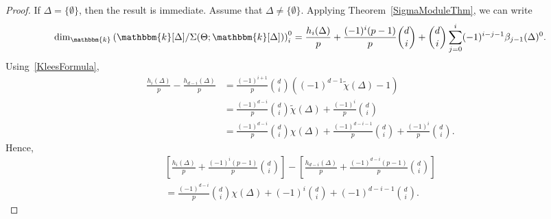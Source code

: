 \documentclass[10pt]{amsart}
\theoremstyle{definition}
\newcommand{\field}{\mathbbm{k}}
\begin{document}
\begin{proof}
If $\Delta=\{\emptyset\}$, then the result is immediate. Assume that $\Delta\not=\{\emptyset\}$. Applying Theorem~\ref{SigmaModuleThm}, we can write
\[
\dim_\field \left(\field[\Delta]/\Sigma(\Theta;\field[\Delta])\right)_i^0=\frac{h_i(\Delta)}{p}+\frac{(-1)^i(p-1)}{p}\binom{d}{i}+\binom{d}{i}\sum_{j=0}^i(-1)^{i-j-1}\beta_{j-1}(\Delta)^0.
\]
Using~\eqref{KleesFormula},
\begin{align*}
\frac{h_i(\Delta)}{p}-\frac{h_{d-i}(\Delta)}{p}&=\frac{(-1)^{i+1}}{p}\binom{d}{i}((-1)^{d-1}\tilde{\chi}(\Delta)-1)\\
&=\frac{(-1)^{d-i}}{p}\binom{d}{i}\tilde{\chi}(\Delta)+\frac{(-1)^i}{p}\binom{d}{i}\\
&=\frac{(-1)^{d-i}}{p}\binom{d}{i}\chi(\Delta)+\frac{(-1)^{d-i-1}}{p}\binom{d}{i}+\frac{(-1)^i}{p}\binom{d}{i}.
\end{align*}
Hence,
\begin{multline}\label{hVectorDifference}
\left[\frac{h_i(\Delta)}{p}+\frac{(-1)^i(p-1)}{p}\binom{d}{i}\right]-\left[\frac{h_{d-i}(\Delta)}{p}+\frac{(-1)^{d-i}(p-1)}{p}\binom{d}{i}\right]\\
=\frac{(-1)^{d-i}}{p}\binom{d}{i}\chi(\Delta)+(-1)^i\binom{d}{i}+(-1)^{d-i-1}\binom{d}{i}.
\end{multline}


\end{proof}
\end{document}
